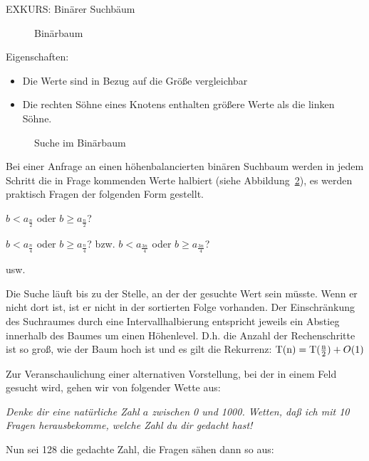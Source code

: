 \documentclass{scrreprt}%
\theoremstyle{break}
\begin{document}
EXKURS: Binärer Suchbäum
\begin{figure}[H]
	\begin{center}\end{center}
	\caption{Binärbaum}
	\label{271003a}
\end{figure}

Eigenschaften:
\begin{itemize}
	\item Die Werte sind in Bezug auf die Größe vergleichbar
	\item Die rechten Söhne eines Knotens enthalten größere Werte als die linken Söhne.
\end{itemize}

\begin{figure}
	\begin{center}\end{center}
	\caption{Suche im Binärbaum}
	\label{271003b}
\end{figure}

Bei einer Anfrage an einen höhenbalancierten binären Suchbaum werden in jedem Schritt die in Frage kommenden Werte halbiert (siehe Abbildung~\ref{271003b}), es
werden praktisch Fragen der folgenden Form gestellt.

 \quad \( b < a_{\frac{n}{2}} \) oder \( b \geq a_{\frac{n}{2}} \)?
 
 \quad \( b < a_{\frac{n}{4}} \) oder \( b \geq a_{\frac{n}{4}} \)? bzw. \( b < a_{\frac{3n}{4}} \) oder \( b \geq a_{\frac{3n}{4}} \)?

 \quad usw. 
 
Die Suche läuft bis zu der Stelle, an der der gesuchte Wert sein müsste. Wenn er nicht dort ist, ist er nicht in der sortierten Folge
vorhanden.
%
Der Einschränkung des Suchraumes durch eine Intervallhalbierung entspricht jeweils ein Abstieg innerhalb des Baumes um einen
Höhenlevel. D.h. die Anzahl der Rechenschritte ist so groß, wie der Baum hoch ist und es gilt die Rekurrenz: 
\(\textup{T}(\textup{n})=\textup{T}(\frac{\textup{n}}{2}) + O(1)\)

Zur Veranschaulichung einer alternativen Vorstellung, bei der in einem Feld gesucht wird, gehen wir von folgender Wette aus:

\textit{Denke dir eine natürliche Zahl $a$ zwischen 0 und 1000. Wetten, daß ich mit 10 Fragen herausbekomme, welche Zahl du dir gedacht
hast!}

Nun sei 128 die gedachte Zahl, die Fragen sähen dann so aus:
\end{document}
